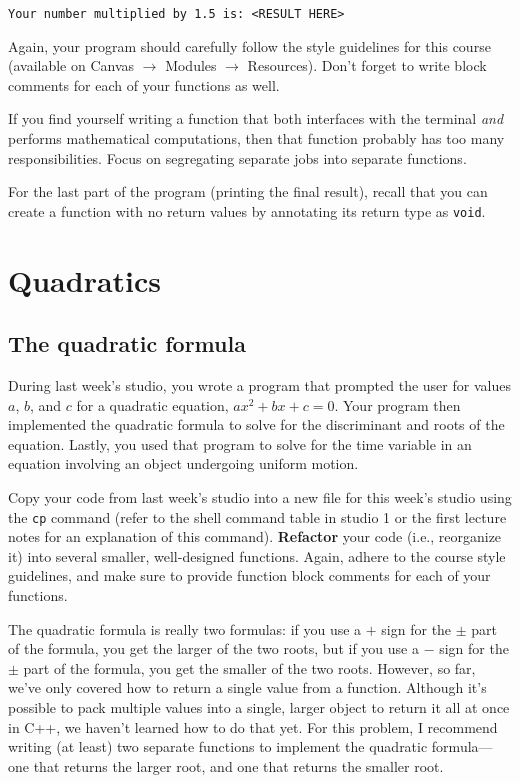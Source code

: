 \documentclass{article}
\newenvironment{hint}
    {\begin{tcolorbox}[title=Hint,colframe=white!70!blue,colback=white]}
    {\end{tcolorbox}}
\begin{document}
\begin{verbatim}
Your number multiplied by 1.5 is: <RESULT HERE>
\end{verbatim}

Again, your program should carefully follow the style guidelines for this course (available on Canvas $\rightarrow$ Modules $\rightarrow$ Resources). Don't forget to write block comments for each of your functions as well.

\begin{hint}
    If you find yourself writing a function that both interfaces with the terminal \textit{and} performs mathematical computations, then that function probably has too many responsibilities. Focus on segregating separate jobs into separate functions.
\end{hint}

\begin{hint}
    For the last part of the program (printing the final result), recall that you can create a function with no return values by annotating its return type as \texttt{void}.
\end{hint}

\section{Quadratics}

\subsection{The quadratic formula}

During last week's studio, you wrote a program that prompted the user for values $a$, $b$, and $c$ for a quadratic equation, $ax^2 + bx + c = 0$. Your program then implemented the quadratic formula to solve for the discriminant and roots of the equation. Lastly, you used that program to solve for the time variable in an equation involving an object undergoing uniform motion.

Copy your code from last week's studio into a new file for this week's studio using the \texttt{cp} command (refer to the shell command table in studio 1 or the first lecture notes for an explanation of this command). \textbf{Refactor} your code (i.e., reorganize it) into several smaller, well-designed functions. Again, adhere to the course style guidelines, and make sure to provide function block comments for each of your functions.

\begin{hint}
    The quadratic formula is really two formulas: if you use a $+$ sign for the $\pm$ part of the formula, you get the larger of the two roots, but if you use a $-$ sign for the $\pm$ part of the formula, you get the smaller of the two roots. However, so far, we've only covered how to return a single value from a function. Although it's possible to pack multiple values into a single, larger object to return it all at once in C++, we haven't learned how to do that yet. For this problem, I recommend writing (at least) two separate functions to implement the quadratic formula---one that returns the larger root, and one that returns the smaller root.
\end{hint}
\end{document}
